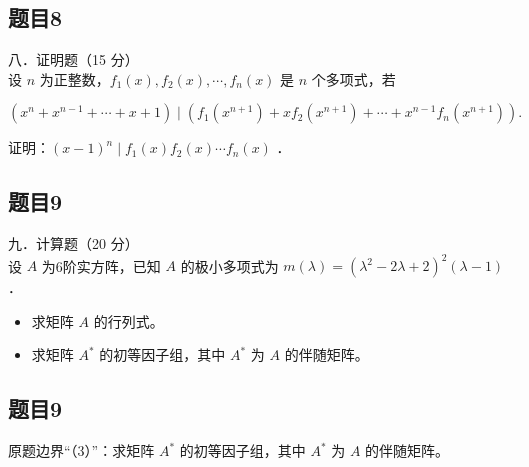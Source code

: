 \documentclass{article}
\begin{document}
\subsection{题目8}
八．证明题（15 分）\\
设 \(n\) 为正整数，\(f_{1}(x), f_{2}(x), \cdots, f_{n}(x)\) 是 \(n\) 个多项式，若

\[
\left(x^{n}+x^{n-1}+\cdots+x+1\right) \mid\left(f_{1}\left(x^{n+1}\right)+x f_{2}\left(x^{n+1}\right)+\cdots+x^{n-1} f_{n}\left(x^{n+1}\right)\right) .
\]

证明：\((x-1)^{n} \mid f_{1}(x) f_{2}(x) \cdots f_{n}(x)\) ．

\subsection{题目9}
九．计算题（20 分）\\
设 \(A\) 为6阶实方阵，已知 \(A\) 的极小多项式为 \(m(\lambda)=\left(\lambda^{2}-2 \lambda+2\right)^{2}(\lambda-1)\) ．

\begin{itemize}
  \item[（1）] 求矩阵 \(A\) 的行列式。
  \item[（2）] 求矩阵 \(A^{*}\) 的初等因子组，其中 \(A^{*}\) 为 \(A\) 的伴随矩阵。
\end{itemize}

\subsection{题目9}
原题边界“（3）”：求矩阵 \(A^{*}\) 的初等因子组，其中 \(A^{*}\) 为 \(A\) 的伴随矩阵。
\end{document}
